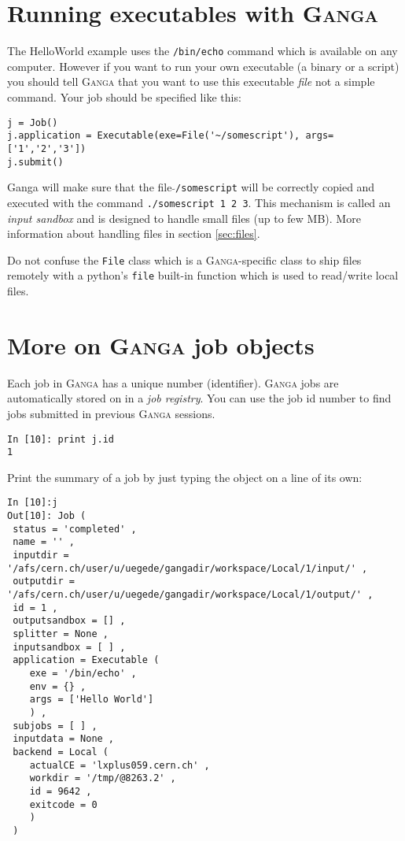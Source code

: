 \documentclass{howto}
\def\ganga {\textsc{Ganga}\xspace}
\begin{document}
\section{Running executables with \ganga}

The  HelloWorld example  uses  the {\tt  /bin/echo}  command which  is
available  on  any computer.  However  if you  want  to  run your  own
executable (a binary or a script) you should tell \ganga that you want
to use  this executable  {\it file} not  a simple command.  Your job
should be specified like this:

\begin{verbatim}
j = Job()
j.application = Executable(exe=File('~/somescript'), args=['1','2','3'])
j.submit()
\end{verbatim}

Ganga  will  make  sure  that  the file  {\tt$\tilde{}$/somescript}  will  be
correctly copied  and executed  with the command  {\tt ./somescript  1 2
3}. This mechanism is called an {\it input sandbox} and is designed to
handle small files (up to few MB). More information about handling files
in section \ref{sec:files}.

\begin{notice}
Do not confuse the {\tt File} class
which  is  a \ganga-specific  class  to  ship  files remotely  with  a
python's  {\tt file}  built-in function  which is  used  to read/write
local files.
\end{notice}


\section{More on \ganga job objects}
Each job in \ganga has a unique number (identifier).  \ganga jobs are
automatically stored on in a {\em job registry}. You can use the job id number
to find jobs submitted in previous \ganga sessions.
\begin{verbatim}
In [10]: print j.id
1
\end{verbatim}

Print the summary of a job by just typing the object on a line of its own:
\begin{verbatim}
In [10]:j
Out[10]: Job (
 status = 'completed' ,
 name = '' ,
 inputdir = '/afs/cern.ch/user/u/uegede/gangadir/workspace/Local/1/input/' ,
 outputdir = '/afs/cern.ch/user/u/uegede/gangadir/workspace/Local/1/output/' ,
 id = 1 ,
 outputsandbox = [] ,
 splitter = None ,
 inputsandbox = [ ] ,
 application = Executable (
    exe = '/bin/echo' ,
    env = {} ,
    args = ['Hello World'] 
    ) ,
 subjobs = [ ] ,
 inputdata = None ,
 backend = Local (
    actualCE = 'lxplus059.cern.ch' ,
    workdir = '/tmp/@8263.2' ,
    id = 9642 ,
    exitcode = 0 
    ) 
 ) 
\end{verbatim}
\end{document}
